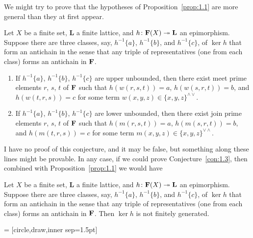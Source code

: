 We might try to prove that the hypotheses of Proposition~\ref{prop:1.1} are more general than they
at first appear.
\begin{conjecture}
  \label{con:1.3}
  Let $X$ be a finite set, $\mathbf{L}$ a finite lattice, and 
  $h\colon \mathbf{F}(X) \twoheadrightarrow \mathbf{L}$ an epimorphism. 
  Suppose there are three classes, say,
  $h^{-1}\{a\}$, $h^{-1}\{b\}$, and $h^{-1}\{c\}$, of $\ker h$ 
  that form an antichain in the sense that
  any triple of representatives (one from each class) forms an antichain in $\mathbf{F}$.
  \begin{enumerate}
    \item If $h^{-1}\{a\}$, $h^{-1}\{b\}$, $h^{-1}\{c\}$ are upper unbounded, 
    then there exist meet prime elements $r$, $s$, $t$ of $\mathbf{F}$ such that 
    $h(w(r,s,t)) = a$, $h(w(s,r,t)) = b$, and $h(w(t,r,s)) = c$
    for some term $w(x, y, z) \in \{x, y, z\}^{\wedge \vee}$.
    \item If $h^{-1}\{a\}$, $h^{-1}\{b\}$, $h^{-1}\{c\}$ are lower unbounded, 
    then there exist join prime elements $r$, $s$, $t$ of $\mathbf{F}$ such that 
    $h(m(r,s,t)) = a$, $h(m(s,r,t)) = b$, and $h(m(t,r,s)) = c$
    for some term $m(x, y, z) \in \{x, y, z\}^{\vee \wedge}$.
  \end{enumerate}
\end{conjecture}
I have no proof of this conjecture, and it may be false, but something along these lines might
be provable. In any case, if we could prove Conjecture~\ref{con:1.3}, then combined with 
Proposition~\ref{prop:1.1} we would have 
\begin{conjecture}
  \label{con:1.3}
Let $X$ be a finite set, $\mathbf{L}$ a finite lattice, and 
$h\colon \mathbf{F}(X) \twoheadrightarrow \mathbf{L}$ an epimorphism. 
Suppose there are three classes, say,
$h^{-1}\{a\}$, $h^{-1}\{b\}$, and $h^{-1}\{c\}$, of $\ker h$ 
that form an antichain in the sense that
any triple of representatives (one from each class) forms an antichain in $\mathbf{F}$.
Then $\operatorname{ker}h$ is not finitely generated.  
\end{conjecture}
 
\newpage

\newcommand{\dotsize}{1.5pt}
   = [circle,draw,inner sep=\dotsize]
  \newcommand{\figscale}{1}
  
